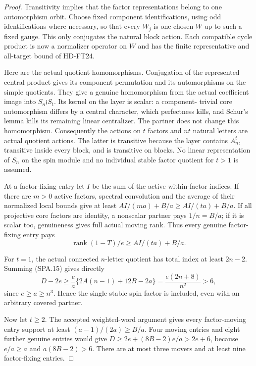 \begin{proof}
Transitivity implies that the factor representations belong to
one automorphism orbit.  Choose fixed component identifications,
using odd identifications where necessary, so that every $W_j$
is one chosen $W$ up to such a fixed gauge.  This only conjugates
the natural block action.  Each compatible cycle product is now
a normalizer operator on $W$ and has the finite representative
and all-target bound of HD-FT24.

Here are the actual quotient homomorphisms.  Conjugation of the
represented central product gives its component permutation and
its automorphisms on the simple quotients.  They give a genuine
homomorphism from the actual coefficient image into
$S_n\wr S_t$.  Its kernel on the layer is scalar: a component-
trivial core automorphism differs by a central character, which
perfectness kills, and Schur's lemma kills its remaining linear
centralizer.  The partner does not change this homomorphism.
Consequently the actions on $t$ factors and $nt$ natural letters
are actual quotient actions.  The latter is transitive because
the layer contains $A_n^t$, transitive inside every block, and
is transitive on blocks.  No linear representation of $S_n$
on the spin module and no individual stable factor quotient
for $t>1$ is assumed.

At a factor-fixing entry let $I$ be the sum of the active
within-factor indices.  If there are $m>0$ active factors,
spectral convolution and the average of their normalized local
bounds give at least $AI/(ma)+B/a\ge AI/(ta)+B/a$.
If all projective core factors are identity, a nonscalar partner
pays $1/n=B/a$; if it is scalar too, genuineness gives full
actual moving rank.  Thus every genuine factor-fixing entry pays
\[
             \operatorname{rank}(1-T)/e\ge AI/(ta)+B/a.
 \tag{SPA.15}
\]

For $t=1$, the actual connected $n$-letter quotient has total
index at least $2n-2$.  Summing (SPA.15) gives directly
\[
 D-2e\ge\frac ea\{2A(n-1)+12B-2a\}
       =\frac{e(2n+8)}{n^2}>6,
 \tag{SPA.16}
\]
since $e\ge a\ge n^3$.  Hence the single stable spin factor
is included, even with an arbitrary covered partner.

Now let $t\ge2$.  The accepted weighted-word argument gives
every factor-moving entry support at least $(a-1)/(2a)\ge B/a$.
Four moving entries and eight further genuine entries would give
$D\ge2e+(8B-2)e/a>2e+6$, because $e/a\ge a$ and
$a(8B-2)>6$.  There are at most three movers and at least nine
factor-fixing entries.


\end{proof}
